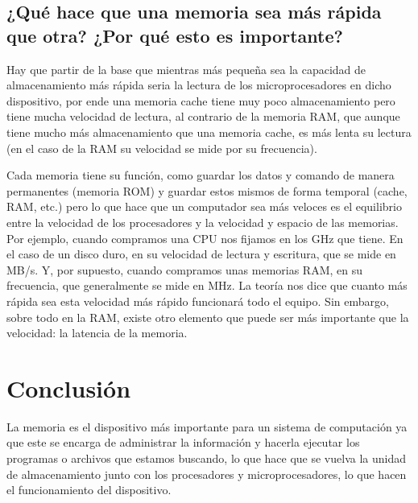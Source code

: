 \documentclass{article}
\begin{document}
\vspace{5cm}

\subsection{¿Qué hace que una memoria sea más rápida que otra? ¿Por qué esto es importante?}

Hay que partir de la base que mientras más pequeña sea la capacidad de almacenamiento más rápida seria la lectura de los microprocesadores en dicho dispositivo, por ende una memoria cache tiene muy poco almacenamiento pero tiene mucha velocidad de lectura, al contrario de la memoria RAM, que aunque tiene mucho más almacenamiento que una memoria cache, es más lenta su lectura (en el caso de la RAM su velocidad se mide por su frecuencia). 

\vspace{1cm}

Cada memoria tiene su función, como guardar los datos y comando de manera permanentes (memoria ROM) y guardar estos mismos de forma temporal (cache, RAM, etc.) pero lo que hace que un computador sea más veloces es el equilibrio entre la velocidad de los procesadores y la velocidad y espacio de las memorias.  Por ejemplo, cuando compramos una CPU nos fijamos en los GHz que tiene. En el caso de un disco duro, en su velocidad de lectura y escritura, que se mide en MB/s. Y, por supuesto, cuando compramos unas memorias RAM, en su frecuencia, que generalmente se mide en MHz. La teoría nos dice que cuanto más rápida sea esta velocidad más rápido funcionará todo el equipo. Sin embargo, sobre todo en la RAM, existe otro elemento que puede ser más importante que la velocidad: la latencia de la memoria. \cite{importancia}

\vspace{8cm}
\section{Conclusión} \label{conclulsion}
La memoria es el dispositivo más importante para un sistema de computación ya que este se encarga de administrar la información y hacerla ejecutar los programas o archivos que estamos buscando, lo que hace que se vuelva la unidad de almacenamiento junto con los procesadores y microprocesadores, lo que hacen el funcionamiento del dispositivo.

\vspace{1cm}



\end{document}
